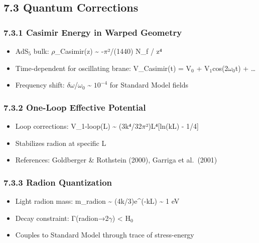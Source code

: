 \documentclass[
  11pt,
]{report}
\providecommand{\tightlist}{%
  \setlength{\itemsep}{0pt}\setlength{\parskip}{0pt}}
\begin{document}
\subsection{7.3 Quantum Corrections}\label{quantum-corrections}

\subsubsection{7.3.1 Casimir Energy in Warped
Geometry}\label{casimir-energy-in-warped-geometry}

\begin{itemize}
\tightlist
\item
  AdS\(_5\) bulk: \(\rho\)\_Casimir(z) \textasciitilde{}
  -\(\pi\)²/(1440) N\_f / z⁴
\item
  Time-dependent for oscillating brane: V\_Casimir(t) = V\(_0\) +
  V\(_1\)cos(2\(\omega_0\)t) + \ldots{}
\item
  Frequency shift: \(\delta\omega\)/\(\omega_0\) \textasciitilde{}
  \(10^{-4}\) for Standard Model fields
\end{itemize}

\subsubsection{7.3.2 One-Loop Effective
Potential}\label{one-loop-effective-potential}

\begin{itemize}
\tightlist
\item
  Loop corrections: V\_1-loop(L) \textasciitilde{}
  (3k⁴/32\(\pi\)²)L⁴{[}ln(kL) - 1/4{]}
\item
  Stabilizes radion at specific L
\item
  References: Goldberger \& Rothstein (2000), Garriga et al.~(2001)
\end{itemize}

\subsubsection{7.3.3 Radion Quantization}\label{radion-quantization}

\begin{itemize}
\tightlist
\item
  Light radion mass: m\_radion \textasciitilde{} (4k/3)e\^{}(-kL)
  \textasciitilde{} 1 eV
\item
  Decay constraint: Γ(radion→2\(\gamma\)) \textless{} H\(_0\)
\item
  Couples to Standard Model through trace of stress-energy
\end{itemize}
\end{document}
